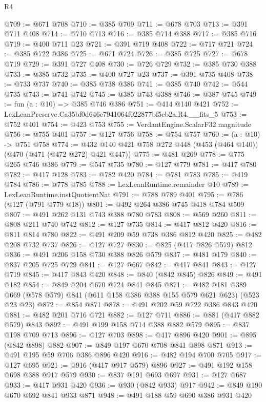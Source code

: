 \begin{lexlean}{R4}
\begin{coremodule}
@709 := @671 @708
@710 := @385 @709
@711 := @678 @703
@713 := @391 @711 @408
@714 := @710 @713
@716 := @385 @714 @388
@717 := @385 @716
@719 := @400 @711 @23
@721 := @391 @719 @408
@722 := @717 @721
@724 := @385 @722 @386
@725 := @671 @724
@726 := @385 @725
@727 := @678 @719
@729 := @391 @727 @408
@730 := @726 @729
@732 := @385 @730 @388
@733 := @385 @732
@735 := @400 @727 @23
@737 := @391 @735 @408
@738 := @733 @737
@740 := @385 @738 @386
@741 := @385 @740
@742 := @544 @735
@743 := @741 @742
@745 := @385 @743 @388
@746 := @387 @745
@749 := fun (a : @10) => @385 @746 @386
@751 := @414 @140 @421
@752 := LexLeanPreserve.Ca35bf0d646e7941064f022877bf5cb2a.R4.__fits_5
@753 := @752 @401
@754 := @423 @753
@755 := VerdantEngine.ScalarF32.magnitude
@756 := @755 @401
@757 := @127 @756
@758 := @754 @757
@760 := (a : @10) -> @751 @758
@774 := @432 @140 @421 @758 @272 @448 (@453 (@464 @140)) (@470 (@471 (@472 @272) @421 @447))
@775 := @481 @269
@778 := @775 @265 @746 @386
@779 := @547 @735
@780 := @127 @779
@781 := @417 @780
@782 := @417 @128
@783 := @782 @420
@784 := @781 @783
@785 := @419 @784
@786 := @778 @785
@788 := LexLeanRuntime.remainder @10
@789 := LexLeanRuntime.instQuotientNat
@791 := @788 @789 @401
@795 := @786 (@127 (@791 @779 @18))
@801 := @492 @264 @386 @745 @418 @784 @509
@807 := @491 @262 @131 @743 @388 @780 @783
@808 := @569 @260
@811 := @808 @211 @740 @742
@812 := @127 @735
@814 := @417 @812 @420
@816 := @811 @814 @780
@822 := @491 @209 @59 @738 @386 @812 @420
@825 := @482 @208 @732 @737
@826 := @127 @727
@830 := @825 (@417 @826 @579) @812
@836 := @491 @206 @158 @730 @388 @826 @579
@837 := @481 @179
@840 := @837 @205 @725 @729
@841 := @127 @667
@842 := @417 @841
@843 := @127 @719
@845 := @417 @843 @420
@848 := @840 (@842 @845) @826
@849 := @491 @182
@854 := @849 @204 @670 @724 @841 @845
@871 := @482
    @181
    @389
    @669
    (@578 @579)
    @841
    (@611 @158 @386 @388 @155 @579 @621 @623)
    (@523 @23 @23)
@872 := @854 @871
@878 := @491 @202 @59 @722 @386 @843 @420
@881 := @482 @201 @716 @721
@882 := @127 @711
@886 := @881 (@417 @882 @579) @843
@892 := @491 @199 @158 @714 @388 @882 @579
@895 := @837 @198 @709 @713
@896 := @127 @703
@898 := @417 @896 @420
@901 := @895 (@842 @898) @882
@907 := @849 @197 @670 @708 @841 @898 @871
@913 := @491 @195 @59 @706 @386 @896 @420
@916 := @482 @194 @700 @705
@917 := @127 @695
@921 := @916 (@417 @917 @579) @896
@927 := @491 @192 @158 @698 @388 @917 @579
@930 := @837 @191 @693 @697
@931 := @127 @687
@933 := @417 @931 @420
@936 := @930 (@842 @933) @917
@942 := @849 @190 @670 @692 @841 @933 @871
@948 := @491 @188 @59 @690 @386 @931 @420

\end{coremodule}
\end{lexlean}
